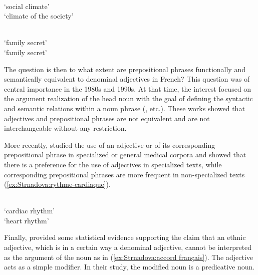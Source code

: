 \documentclass[output=paper]{LSP/langsci}
\begin{document}
\begin{exe}
\ex \begin{xlist} \label{ex:Strnadova:de-équivalence}
\\ `social climate'
\\ `climate of the society'
\end{xlist}
\end{exe}
\begin{exe}
\ex \label{ex:Strnadova:famille-équivalence} \begin{xlist}
\\ `family secret'
\\ `family secret'
\end{xlist}
\end{exe}

The question is then to what extent are prepositional phrases functionally and semantically equivalent to denominal adjectives in French? This question was of central importance in the 1980s and 1990s. At that time, the interest focused on the argument realization of the head noun with the goal of defining the syntactic and semantic relations within a noun phrase (\citealt{bartning1980, pinchon1980, monceaux1993}, etc.). These works showed that adjectives and prepositional phrases are not equivalent and are not interchangeable without any restriction.

More recently, \citet{cartonideleger2010} studied the use of an adjective or of its corresponding prepositional phrase in specialized or general medical corpora and showed that there is a preference for the use of adjectives in specialized texts, while corresponding prepositional phrases are more frequent in non-specialized texts (\ref{ex:Strnadova:rythme-cardiaque}).


\begin{exe}
\ex \begin{xlist}\label{ex:Strnadova:rythme-cardiaque}
\\ `cardiac rhythm'
\\  `heart rhythm'
\end{xlist}
\end{exe}

Finally, \citet{boledaevert2012} provided some statistical evidence supporting the claim that an ethnic adjective, which is in a certain way a denominal adjective, cannot be interpreted as the argument of the noun as in (\ref{ex:Strnadova:accord français}). The adjective acts as a simple modifier. In their study, the modified noun is a predicative noun.
\end{document}
